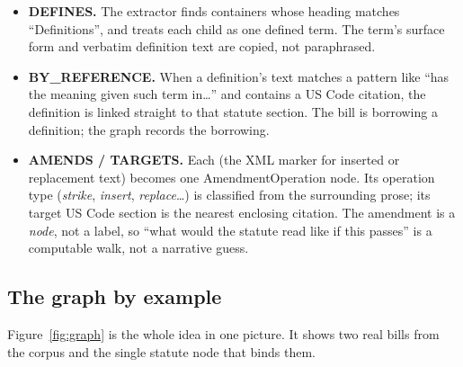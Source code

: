 \documentclass[11pt]{article}
\newcommand{\code}[1]{{\ttfamily\small #1}}
\begin{document}
\begin{itemize}[leftmargin=1.4em,itemsep=2pt]
\item \textbf{\code{DEFINES}.} The extractor finds containers whose heading
  matches ``Definitions'', and treats each child as one defined term. The
  term's surface form and verbatim definition text are copied, not paraphrased.
\item \textbf{\code{BY\_REFERENCE}.} When a definition's text matches a pattern
  like ``has the meaning given such term in\ldots'' and contains a US Code
  citation, the definition is linked straight to that statute section. The bill
  is borrowing a definition; the graph records the borrowing.
\item \textbf{\code{AMENDS} / \code{TARGETS}.} Each \code{<quoted-block>} (the
  XML marker for inserted or replacement text) becomes one
  \code{AmendmentOperation} node. Its operation type (\emph{strike},
  \emph{insert}, \emph{replace}\ldots) is classified from the surrounding
  prose; its target US Code section is the nearest enclosing citation. The
  amendment is a \emph{node}, not a label, so ``what would the statute read like
  if this passes'' is a computable walk, not a narrative guess.
\end{itemize}

\subsection{The graph by example}

Figure~\ref{fig:graph} is the whole idea in one picture. It shows two real
bills from the corpus and the single statute node that binds them.
\end{document}
